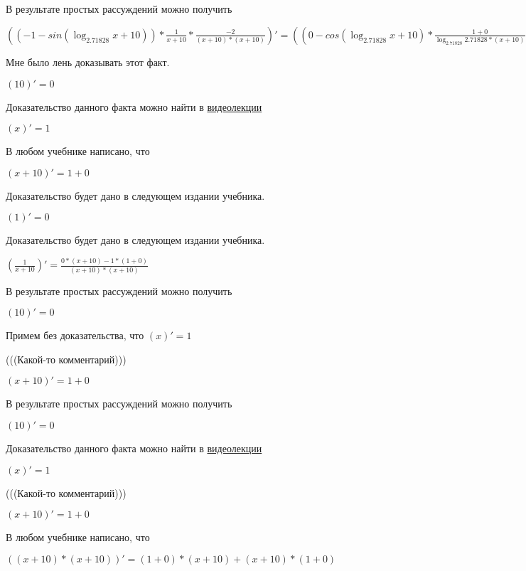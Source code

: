 \documentclass[12pt,a4paper,fleqn]{article}
\theoremstyle{definition}
\begin{document}
В результате простых рассуждений можно получить

$(( -1  - sin(\log_{ 2.71828 }{ x  +  10 })) * \frac{ 1 }{ x  +  10 }
 * \frac{ -2 }{( x  +  10 ) * ( x  +  10 )}
)' = (( 0  - cos(\log_{ 2.71828 }{ x  +  10 }) * \frac{ 1  +  0 }{\log_{ 2.71828 }{ 2.71828 } * ( x  +  10 )}
) * \frac{ 1 }{ x  +  10 }
 + ( -1  - sin(\log_{ 2.71828 }{ x  +  10 })) * \frac{ 0  * ( x  +  10 ) -  1  * ( 1  +  0 )}{( x  +  10 ) * ( x  +  10 )}
) * \frac{ -2 }{( x  +  10 ) * ( x  +  10 )}
 + ( -1  - sin(\log_{ 2.71828 }{ x  +  10 })) * \frac{ 1 }{ x  +  10 }
 * \frac{ 0  * ( x  +  10 ) * ( x  +  10 ) -  -2  * (( 1  +  0 ) * ( x  +  10 ) + ( x  +  10 ) * ( 1  +  0 ))}{( x  +  10 ) * ( x  +  10 ) * ( x  +  10 ) * ( x  +  10 )}
$

Мне было лень доказывать этот факт.

$( 10 )' =  0 $

Доказательство данного факта можно найти в \href{https://www.youtube.com/watch?v=dQw4w9WgXcQ}{видеолекции}

$( x )' =  1 $

В любом учебнике написано, что

$( x  +  10 )' =  1  +  0 $

Доказательство будет дано в следующем издании учебника.

$( 1 )' =  0 $

Доказательство будет дано в следующем издании учебника.

$(\frac{ 1 }{ x  +  10 }
)' = \frac{ 0  * ( x  +  10 ) -  1  * ( 1  +  0 )}{( x  +  10 ) * ( x  +  10 )}
$

В результате простых рассуждений можно получить

$( 10 )' =  0 $

Примем без доказательства, что
$( x )' =  1 $

(((Какой-то комментарий)))

$( x  +  10 )' =  1  +  0 $

В результате простых рассуждений можно получить

$( 10 )' =  0 $

Доказательство данного факта можно найти в \href{https://www.youtube.com/watch?v=dQw4w9WgXcQ}{видеолекции}

$( x )' =  1 $

(((Какой-то комментарий)))

$( x  +  10 )' =  1  +  0 $

В любом учебнике написано, что

$(( x  +  10 ) * ( x  +  10 ))' = ( 1  +  0 ) * ( x  +  10 ) + ( x  +  10 ) * ( 1  +  0 )$
\end{document}
